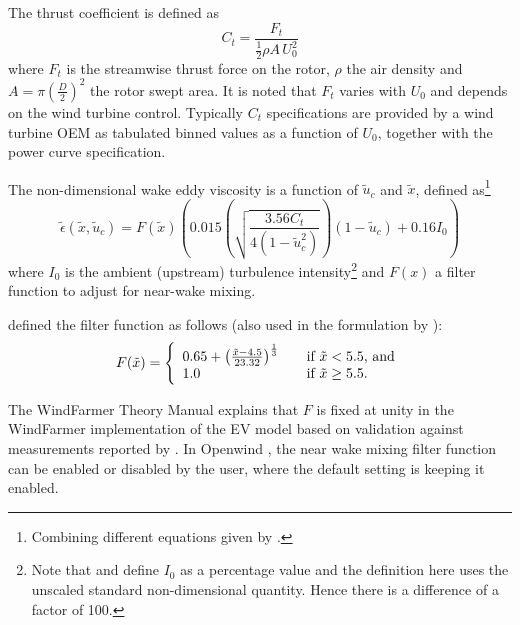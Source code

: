 \documentclass[11pt,a4paper]{article}
\begin{document}
The thrust coefficient is defined as
\begin{equation}
C_{t} = \frac{F_{t}}{\frac{1}{2} \rho A \, U_{0}^{2}}
\end{equation}
where $F_{t}$ is the streamwise thrust force on the rotor, $\rho$ the air density and $A = \pi (\frac{D}{2})^{2}$ the rotor swept area. It is noted that $F_{t}$ varies with $U_{0}$ and depends on the wind turbine control. Typically $C_{t}$ specifications are provided by a wind turbine OEM as tabulated binned values as a function of $U_{0}$, together with the power curve specification.

The non-dimensional wake eddy viscosity is a function of $\tilde{u}_{c}$ and $\tilde{x}$, defined as\footnote{Combining different equations given by \textcite{Anderson_2011}.}
\begin{equation}\label{eq:epsilon_uc}
\tilde{\epsilon} (\tilde{x}, \tilde{u}_{c}) =
  F(\tilde{x}) \left(
    0.015 \left( \sqrt{\frac{3.56 C_{t}}{4 \left( 1 - \tilde{u}_{c}^{2} \right)}} \right) \left( 1 - \tilde{u}_{c} \right)+ 0.16 I_{0}
  \right)
\end{equation}
where $I_{0}$ is the ambient (upstream) turbulence intensity\footnote{Note that \textcite{Ainslie_1988} and \textcite{Anderson_2011} define $I_{0}$ as a percentage value and the definition here uses the unscaled standard non-dimensional quantity. Hence there is a difference of a factor of 100.} and $F(x)$ a filter function to adjust for near-wake mixing.

\textcite{Ainslie_1988} defined the filter function as follows (also used in the formulation by \cite{Anderson_2011}):
\begin{equation}\label{eq:filter_function}
F(\tilde{x}) = \left\{
  \begin{array}{ l l }
    0.65 + \left( \frac{\tilde{x} - 4.5}{23.32} \right) ^{\frac{1}{3}} & \quad \textrm{if } \tilde{x} < 5.5 \textrm{, and} \\
    1.0                                                                & \quad \textrm{if } \tilde{x} \geq 5.5.
  \end{array}
\right.
\end{equation}

The WindFarmer Theory Manual \parencite{WindFarmer_Theory_Manual} explains that $F$ is fixed at unity in the WindFarmer implementation of the EV model based on validation against measurements reported by \textcite{Taylor_1990}. In Openwind \parencite{Openwind_Theory_Manual}, the near wake mixing filter function can be enabled or disabled by the user, where the default setting is keeping it enabled.
\end{document}
